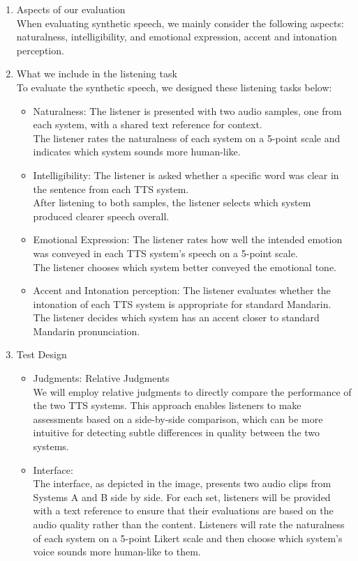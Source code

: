 \documentclass{../labbook}
\begin{document}
\begin{solution}
\begin{enumerate}
    \item Aspects of our evaluation \\ When evaluating synthetic speech, we mainly consider the following aspects: naturalness, intelligibility, and emotional expression, accent and intonation perception.
    \item What we include in the listening task \\
    To evaluate the synthetic speech, we designed these listening tasks below:
    \begin{itemize}
        \item Naturalness: The listener is presented with two audio samples, one from each system, with a shared text reference for context.\\The listener rates the naturalness of each system on a 5-point scale and indicates which system sounds more human-like.
        \item Intelligibility: The listener is asked whether a specific word was clear in the sentence from each TTS system.\\After listening to both samples, the listener selects which system produced clearer speech overall.
        \item Emotional Expression: The listener rates how well the intended emotion was conveyed in each TTS system's speech on a 5-point scale.\\The listener chooses which system better conveyed the emotional tone.        
        \item Accent and Intonation perception: The listener evaluates whether the intonation of each TTS system is appropriate for standard Mandarin.\\The listener decides which system has an accent closer to standard Mandarin pronunciation.
    \end{itemize}
    \item Test Design
    \begin{itemize}
        \item Judgments: Relative Judgments\\We will employ relative judgments to directly compare the performance of the two TTS systems. This approach enables listeners to make assessments based on a side-by-side comparison, which can be more intuitive for detecting subtle differences in quality between the two systems.
        \item Interface: \\The interface, as depicted in the image, presents two audio clips from Systems A and B side by side. For each set, listeners will be provided with a text reference to ensure that their evaluations are based on the audio quality rather than the content. Listeners will rate the naturalness of each system on a 5-point Likert scale and then choose which system's voice sounds more human-like to them.

\end{itemize}
\end{enumerate}
\end{solution}
\end{document}

